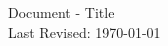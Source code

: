 \documentclass[11pt]{article}
\makeatletter
\newcommand{\namesigdate}[2][5cm]{
    \begin{tabular}{@{}p{#1}@{}}
    #2 \\[2\normalbaselineskip] \hrule \\[0pt]
    {\small \textit{Signature}} \\[2\normalbaselineskip] \hrule \\[0pt]
    {\small \textit{Date}}
    \end{tabular}
}
\makeatother
\begin{document}
 

\begin{center}

	\hrulefill\\
	\hrulefill\\
                Document - Title\\
		Last Revised: \today\\
	\hrulefill\\
	\hrulefill\\

\end{center}








 
\end{document}
